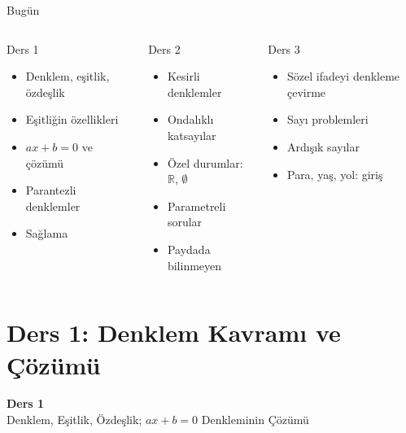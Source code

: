 \documentclass[aspectratio=169,11pt,handout]{beamer}
\begin{document}
\begin{frame}{Bugün}
\begin{columns}[t]
\begin{block}{Ders 1}
\begin{itemize}
\item Denklem, eşitlik, özdeşlik
\item Eşitliğin özellikleri
\item \(ax+b=0\) ve çözümü
\item Parantezli denklemler
\item Sağlama
\end{itemize}
\end{block}
\begin{block}{Ders 2}
\begin{itemize}
\item Kesirli denklemler
\item Ondalıklı katsayılar
\item Özel durumlar: \(\mathbb{R}\), \(\emptyset\)
\item Parametreli sorular
\item Paydada bilinmeyen
\end{itemize}
\end{block}
\begin{block}{Ders 3}
\begin{itemize}
\item Sözel ifadeyi denkleme çevirme
\item Sayı problemleri
\item Ardışık sayılar
\item Para, yaş, yol: giriş
\end{itemize}
\end{block}
\end{columns}
\end{frame}

\section{Ders 1: Denklem Kavramı ve Çözümü}
\begin{frame}
\centering\Large\color{anamavi}\textbf{Ders 1}\\[6pt]\normalsize Denklem, Eşitlik, Özdeşlik; \(ax+b=0\) Denkleminin Çözümü
\end{frame}
\end{document}
